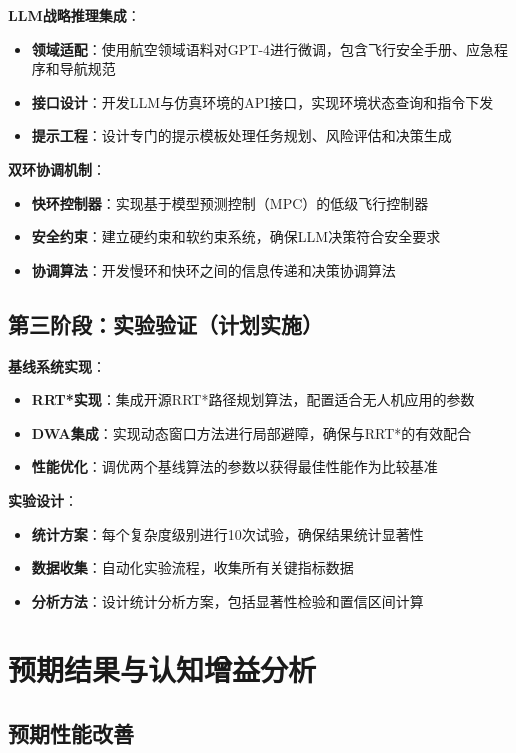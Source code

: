 \textbf{LLM战略推理集成}：
\begin{itemize}
\item \textbf{领域适配}：使用航空领域语料对GPT-4进行微调，包含飞行安全手册、应急程序和导航规范
\item \textbf{接口设计}：开发LLM与仿真环境的API接口，实现环境状态查询和指令下发
\item \textbf{提示工程}：设计专门的提示模板处理任务规划、风险评估和决策生成
\end{itemize}

\textbf{双环协调机制}：
\begin{itemize}
\item \textbf{快环控制器}：实现基于模型预测控制（MPC）的低级飞行控制器
\item \textbf{安全约束}：建立硬约束和软约束系统，确保LLM决策符合安全要求
\item \textbf{协调算法}：开发慢环和快环之间的信息传递和决策协调算法
\end{itemize}

\subsection{第三阶段：实验验证（计划实施）}

\textbf{基线系统实现}：
\begin{itemize}
\item \textbf{RRT*实现}：集成开源RRT*路径规划算法，配置适合无人机应用的参数
\item \textbf{DWA集成}：实现动态窗口方法进行局部避障，确保与RRT*的有效配合
\item \textbf{性能优化}：调优两个基线算法的参数以获得最佳性能作为比较基准
\end{itemize}

\textbf{实验设计}：
\begin{itemize}
\item \textbf{统计方案}：每个复杂度级别进行10次试验，确保结果统计显著性
\item \textbf{数据收集}：自动化实验流程，收集所有关键指标数据
\item \textbf{分析方法}：设计统计分析方案，包括显著性检验和置信区间计算
\end{itemize}

\section{预期结果与认知增益分析}

\subsection{预期性能改善}

